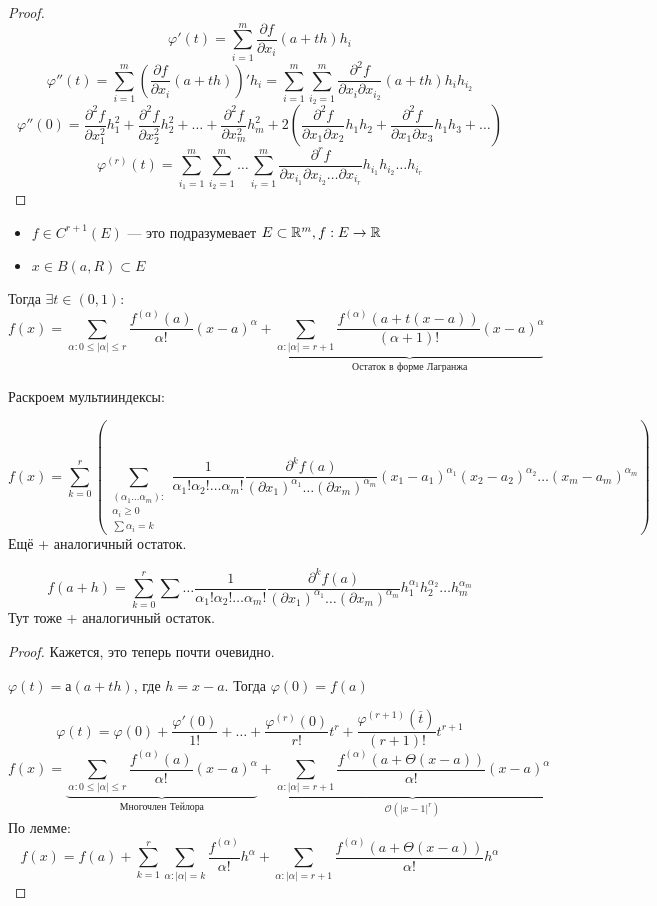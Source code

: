 \begin{proof}
    $$\varphi'(t)=\sum_{i=1}^m \frac{\partial f}{\partial x_i}(a+th)h_i$$
    $$\varphi''(t)=\sum_{i=1}^m \left(\frac{\partial f}{\partial x_i}(a+th)\right)'h_i=\sum_{i=1}^m \sum_{i_2=1}^m \frac{\partial^2 f}{\partial x_i\partial x_{i_2}}(a+th)h_ih_{i_2}$$
    $$\varphi''(0)=\frac{\partial^2 f}{\partial x_1^2}h_1^2 + \frac{\partial^2 f}{\partial x_2^2}h_2^2 + \ldots + \frac{\partial^2 f}{\partial x_m^2}h_m^2 + 2\left( \frac{\partial^2 f}{\partial x_1\partial x_2}h_1h_2 + \frac{\partial^2 f}{\partial x_1\partial x_3}h_1h_3 + \ldots \right)$$
    $$\varphi^{(r)}(t)=\sum_{i_1=1}^m\sum_{i_2=1}^m\ldots \sum_{i_r=1}^m \frac{\partial^r f}{\partial x_{i_1}\partial x_{i_2}\ldots \partial x_{i_r}} h_{i_1}h_{i_2}\ldots h_{i_r}$$
\end{proof}

\begin{theorem}
    \itemfix
    \begin{itemize}
        \item $f\in C^{r+1}(E)$ --- это подразумевает $E\subset\mathbb{R}^m, f:E\to\mathbb{R}$
        \item $x\in B(a, R)\subset E$
    \end{itemize}
    Тогда $\exists t\in(0, 1)$:
    $$f(x) = \sum_{\alpha : 0\le |\alpha|\le r} \frac{f^{(\alpha)}(a)}{\alpha!}(x-a)^\alpha + \underbrace{\sum_{\alpha : |\alpha|=r+1} \frac{f^{(\alpha)}(a+t(x-a))}{(\alpha+1)!}(x-a)^\alpha}_{\text{Остаток в форме Лагранжа}}$$
\end{theorem}

Раскроем мультииндексы:

$$f(x)=\sum_{k=0}^r\left( \sum_{\substack{(\alpha_1\ldots \alpha_m): \\ \alpha_i\ge 0 \\ \sum \alpha_i = k}} \frac{1}{\alpha_1!\alpha_2!\ldots\alpha_m!} \frac{\partial^k f(a)}{(\partial x_1)^{\alpha_1}\ldots (\partial x_m)^{\alpha_m}} (x_1-a_1)^{\alpha_1}(x_2-a_2)^{\alpha_2}\ldots (x_m-a_m)^{\alpha_m} \right)$$
Ещё + аналогичный остаток.

$$f(a+h)=\sum_{k=0}^r\sum\ldots \frac{1}{\alpha_1!\alpha_2!\ldots\alpha_m!} \frac{\partial^k f(a)}{(\partial x_1)^{\alpha_1}\ldots (\partial x_m)^{\alpha_m}} h_1^{\alpha_1}h_2^{\alpha_2}\ldots h_m^{\alpha_m}$$
Тут тоже + аналогичный остаток.

\begin{proof}
    Кажется, это теперь почти очевидно.

    $\varphi(t) = а(a+th)$, где $h=x-a$. Тогда $\varphi(0)=f(a)$

    $$\varphi(t) = \varphi(0) + \frac{\varphi'(0)}{1!}+\ldots+\frac{\varphi^{(r)}(0)}{r!}t^r+\frac{\varphi^{(r+1)}(\overline t)}{(r+1)!}t^{r+1}$$
    $$f(x) = \underbrace{\sum_{\alpha : 0\le |\alpha|\le r} \frac{f^{(\alpha)}(a)}{\alpha!}(x-a)^\alpha}_{\text{Многочлен Тейлора}} + \underbrace{\sum_{\alpha : |\alpha| = r+1} \frac{f^{(\alpha)}(a+\Theta(x-a))}{\alpha!}(x-a)^\alpha}_{\mathcal O (|x-1|^r)}$$
    По лемме:
    $$f(x)=f(a) + \sum_{k=1}^r\sum_{\alpha : |\alpha|=k}\frac{f^{(\alpha)}}{\alpha!}h^\alpha + \sum_{\alpha : |\alpha| = r+1} \frac{f^{(\alpha)}(a+\Theta(x-a))}{\alpha!}h^\alpha$$
\end{proof}

